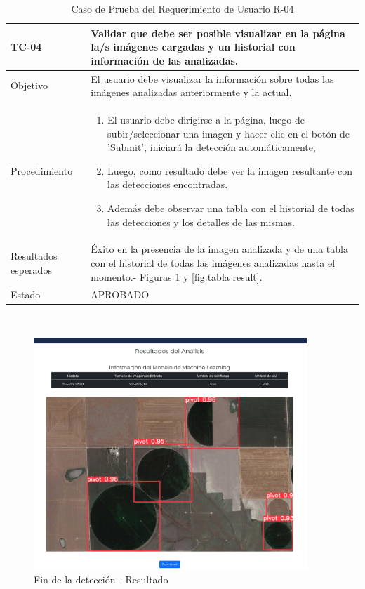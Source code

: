 \begin{table}[h!]
    \begin{tabular}{ | p{3cm} |p{9cm}| }
        \hline
        \rowcolor[HTML]{d6d8ff}
        TC-04 & Validar que debe ser posible visualizar en la página la/s imágenes cargadas y un historial con información de las analizadas.\\
        \hline
        Objetivo & El usuario debe visualizar la información sobre todas las imágenes analizadas anteriormente y la actual.\\
        \hline
        Procedimiento & \begin{enumerate}
            \item El usuario debe dirigirse a la página, luego de subir/seleccionar una imagen y hacer clic en el botón de 'Submit', iniciará la detección automáticamente, 
            \item Luego, como resultado debe ver la imagen resultante con las detecciones encontradas.
            \item Además debe observar una tabla con el historial de todas las detecciones y los detalles de las mismas.
        \end{enumerate}
        \\
        \hline
        Resultados esperados & Éxito en la presencia de la imagen analizada y de una tabla con el historial de todas las imágenes analizadas hasta el momento.- Figuras \ref{fig:resultado} y \ref{fig:tabla result}.\\
        \hline
        Estado & APROBADO \\
        \hline
    \end{tabular}\\
    \caption{Caso de Prueba del Requerimiento de Usuario R-04}
    \label{pruebar4}
\end{table}

\begin{figure}[h!]
    \centering
    \includegraphics[width=0.92\textwidth]{img/FE - results.png}
    \caption{Fin de la detección - Resultado}
    \label{fig:resultado}
\end{figure}

